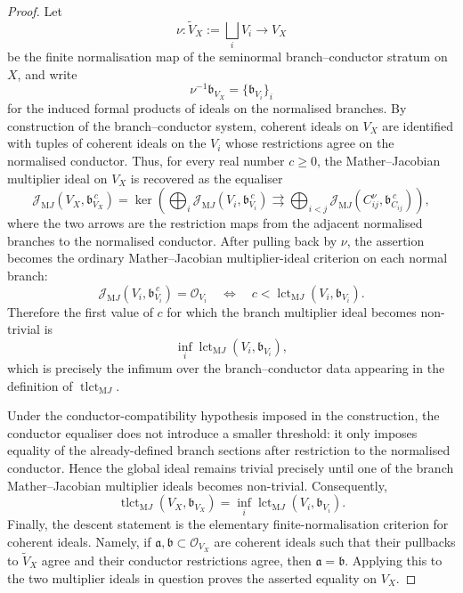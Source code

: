 \documentclass[11pt]{amsart}
\numberwithin{equation}{section}
\theoremstyle{plain}
\theoremstyle{definition}
\newcommand{\tlct}{\operatorname{tlct}}
\newcommand{\bbound}{\mathfrak b}
\begin{document}
\begin{proof}
Let
\[
\nu:\widetilde V_X:=\bigsqcup_i V_i\longrightarrow V_X
\]
be the finite normalisation map of the seminormal branch--conductor stratum on $X$, and write
\[
\nu^{-1}\bbound_{V_X}=\{\bbound_{V_i}\}_i
\]
for the induced formal products of ideals on the normalised branches. By construction of the branch--conductor system, coherent ideals on \(V_X\) are identified with tuples of coherent ideals on the \(V_i\) whose restrictions agree on the normalised conductor. Thus, for every real number \(c\geq 0\), the Mather--Jacobian multiplier ideal on \(V_X\) is recovered as the equaliser
\[
\mathcal J_{\mathrm MJ}(V_X,\bbound_{V_X}^{\,c})
=
\ker\left(
\bigoplus_i \mathcal J_{\mathrm MJ}(V_i,\bbound_{V_i}^{\,c})
\rightrightarrows
\bigoplus_{i<j}
\mathcal J_{\mathrm MJ}(C_{ij}^{\nu},\bbound_{C_{ij}}^{\,c})
\right),
\]
where the two arrows are the restriction maps from the adjacent normalised branches to the normalised conductor.
After pulling back by \(\nu\), the assertion becomes the ordinary Mather--Jacobian multiplier-ideal criterion \cite{EI,dFD} on each normal branch:
\[
\mathcal J_{\mathrm MJ}(V_i,\bbound_{V_i}^{\,c})=\mathcal O_{V_i}
\quad\Longleftrightarrow\quad
c<\operatorname{lct}_{\mathrm MJ}(V_i,\bbound_{V_i}).
\]
Therefore the first value of \(c\) for which the branch multiplier ideal becomes non-trivial is
\[
\inf_i \operatorname{lct}_{\mathrm MJ}(V_i,\bbound_{V_i}),
\]
which is precisely the infimum over the branch--conductor data appearing in the definition of \(\tlct_{\mathrm MJ}\).

Under the conductor-compatibility hypothesis imposed in the construction, the conductor equaliser does not introduce a smaller threshold: it only imposes equality of the already-defined branch sections after restriction to the normalised conductor. Hence the global ideal remains trivial precisely until one of the branch Mather--Jacobian multiplier ideals becomes non-trivial. Consequently,
\[
\tlct_{\mathrm MJ}(V_X,\bbound_{V_X})
=
\inf_i \operatorname{lct}_{\mathrm MJ}(V_i,\bbound_{V_i}).
\]
Finally, the descent statement is the elementary finite-normalisation criterion for coherent ideals. Namely, if \(\mathfrak a,\mathfrak b\subset\mathcal O_{V_X}\) are coherent ideals such that their pullbacks to \(\widetilde V_X\) agree and their conductor restrictions agree, then \(\mathfrak a=\mathfrak b\). Applying this to the two multiplier ideals in question proves the asserted equality on \(V_X\).
\end{proof}
\end{document}
